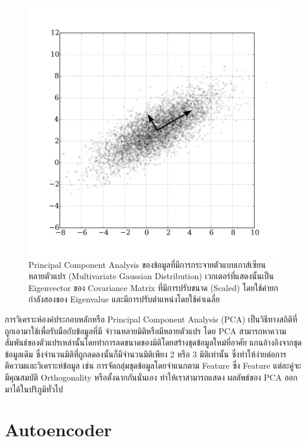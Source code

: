 \begin{figure}[H]
    \centering
    \includegraphics[width=0.8\linewidth]{fig/pca.png}
    \caption{Principal Component Analysis ของข้อมูลที่มีการกระจายตัวแบบเกาส์เซียนหลายตัวแปร (Multivariate Gaussian
    Distribution) เวกเตอร์ที่แสดงนั้นเป็น Eigenvector ของ Covariance Matrix ที่มีการปรับขนาด (Scaled) โดยใช้ค่ายกกำลังสองของ 
    Eigenvalue และมีการปรับตำแหน่งโดยใช้ค่าเฉลี่ย}
    \label{fig:pca}
\end{figure}

การวิเคราะห์องค์ประกอบหลักหรือ Principal Component Analysis (PCA) เป็นวิธีทางสถิติที่ถูกเอามาใช้เพื่อรับมือกับข้อมูลที่มี
จำวนหลายมิติหรือมีหลายตัวแปร โดย PCA สามารถหาความสัมพันธ์ของตัวแปรเหล่านั้นโดยทำการลดขนาดของมิติโดยสร้างชุดข้อมูลใหม่ที่อาศัย
แกนอ้างอิงจากชุดข้อมูลเดิม ซึ่งจำนวนมิติที่ถูกลดลงนั้นก็มีจำนวนมิติเพียง 2 หรือ 3 มิติเท่านั้น ซึ่งทำให้ง่ายต่อการตีความและวิเคราะห์ข้อมูล เช่น
การจัดกลุ่มชุดข้อมูลโดยจำแนกตาม Feature ซึ่ง Feature แต่ละคู่จะมีคุณสมบัติ Orthogonality หรือตั้งฉากกันนั่นเอง ทำให้เราสามารถแสดง
ผลลัพธ์ของ PCA ออกมาได้ในปริภูมิทั่วไป

\section{Autoencoder}

